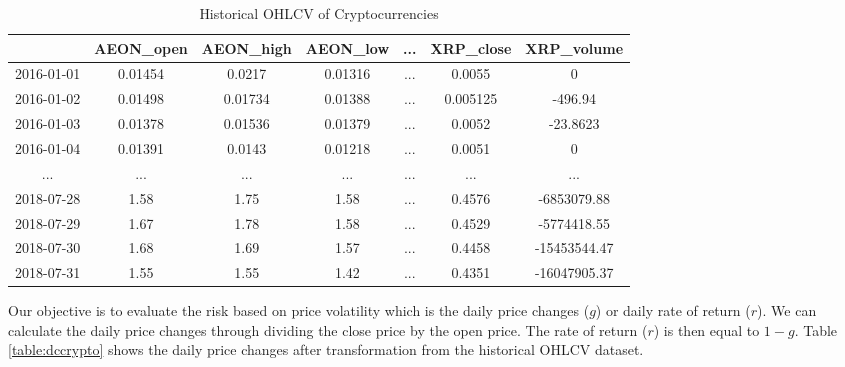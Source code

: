 \documentclass[11pt]{article} %
\theoremstyle{plain}
\theoremstyle{definition}
\begin{document}
{
  \begin{table}[ht]
    \centering
    \scriptsize
    \begin{tabular}{|c|c c c c c c|}
      \hline
       & AEON\_open & AEON\_high & AEON\_low & ... & XRP\_close & XRP\_volume \\ [0.5ex]
      \hline
      2016-01-01 & 0.01454 & 0.0217 & 0.01316 & ... & 0.0055 & 0 \\
      \hline
      2016-01-02 & 0.01498 & 0.01734 & 0.01388 & ... & 0.005125 & -496.94 \\
      \hline
      2016-01-03 & 0.01378 & 0.01536 & 0.01379 & ... & 0.0052 & -23.8623 \\
      \hline
      2016-01-04 & 0.01391 & 0.0143 & 0.01218 & ... & 0.0051 & 0 \\
      \hline
      ... & ... & ... & ... & ... & ... & ... \\
      \hline
      2018-07-28 & 1.58 & 1.75 & 1.58 & ... & 0.4576 & -6853079.88 \\
      \hline
      2018-07-29 & 1.67 & 1.78 & 1.58 & ... & 0.4529 & -5774418.55 \\
      \hline
      2018-07-30 & 1.68 & 1.69 & 1.57 & ... & 0.4458 & -15453544.47 \\
      \hline
      2018-07-31 & 1.55 & 1.55 & 1.42 & ... & 0.4351 & -16047905.37 \\
      \hline
    \end{tabular}
    \caption{Historical OHLCV of Cryptocurrencies}
    \label{table:ohlcvcrypto}
  \end{table}
}

Our objective is to evaluate the risk based on price volatility which is the daily price changes ($g$) or daily rate of return ($r$). We can calculate the daily price changes through dividing the close price by the open price. The rate of return ($r$) is then equal to $1 - g$. Table \ref{table:dccrypto} shows the daily price changes after transformation from the historical OHLCV dataset.
\end{document}
